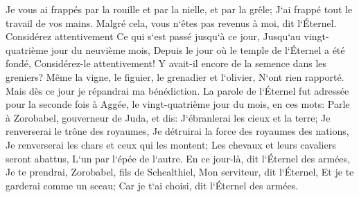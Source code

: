 \verse Je vous ai frappés par la rouille et par la nielle, et par la grêle; J`ai frappé tout le travail de vos mains. Malgré cela, vous n`êtes pas revenus à moi, dit l`Éternel. 
\verse Considérez attentivement Ce qui s`est passé jusqu`à ce jour, Jusqu`au vingt-quatrième jour du neuvième mois, Depuis le jour où le temple de l`Éternel a été fondé, Considérez-le attentivement! 
\verse Y avait-il encore de la semence dans les greniers? Même la vigne, le figuier, le grenadier et l`olivier, N`ont rien rapporté. Mais dès ce jour je répandrai ma bénédiction. 
\verse La parole de l`Éternel fut adressée pour la seconde fois à Aggée, le vingt-quatrième jour du mois, en ces mots: 
\verse Parle à Zorobabel, gouverneur de Juda, et dis: J`ébranlerai les cieux et la terre; 
\verse Je renverserai le trône des royaumes, Je détruirai la force des royaumes des nations, Je renverserai les chars et ceux qui les montent; Les chevaux et leurs cavaliers seront abattus, L`un par l`épée de l`autre. 
\verse En ce jour-là, dit l`Éternel des armées, Je te prendrai, Zorobabel, fils de Schealthiel, Mon serviteur, dit l`Éternel, Et je te garderai comme un sceau; Car je t`ai choisi, dit l`Éternel des armées. 
